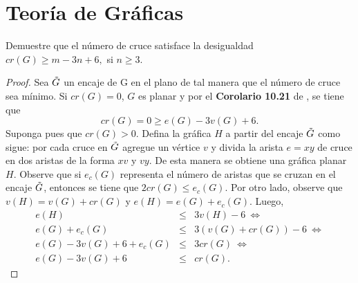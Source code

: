 \documentclass[12pt]{article}
\newenvironment{problem}[2][Problema]{\begin{trivlist}
\item[\hskip \labelsep {\bfseries #1}\hskip \labelsep {\bfseries #2.}]}{\end{trivlist}}
\begin{document}
\section*{Teoría de Gráficas}


\begin{problem}{10.3.1}
Demuestre que el número de cruce satisface la desigualdad $cr(G) \geq m - 3n + 6,$ si $n \geq 3.$
\end{problem}
\begin{proof}
Sea $\Tilde{G}$ un encaje de G en el plano de tal manera que el número de cruce sea mínimo. Si $cr(G)  = 0$, $G$ es planar y por el \textbf{Corolario 10.21} de \cite{10.5555/1481153}, se tiene que
$$cr(G) = 0 \geq e(G) - 3v(G) + 6.$$
Suponga pues que $cr(G) > 0.$ Defina la gráfica $H$ a partir del encaje $\Tilde{G}$ como sigue: por cada cruce en $\Tilde{G}$ agregue un vértice $v$ y divida la arista $e = xy$ de cruce en dos aristas de la forma $xv$ y $vy.$ De esta manera se obtiene una gráfica planar $H$. Observe que si $e_c(G)$ representa el número de aristas que se cruzan en el encaje $\Tilde{G}$, entonces se tiene que $2 cr(G) \leq e_c(G).$ Por otro lado, observe que $v(H) = v(G) + cr(G)$ y $e(H) = e(G) + e_c(G).$ Luego,
\begin{eqnarray*}
e(H) &\leq& 3 v(H) - 6 \ \iff \\
e(G) + e_c(G) &\leq& 3(v(G) + cr(G)) -6 \ \iff \\
e(G) - 3v(G) + 6 + e_c(G) &\leq& 3cr(G) \ \iff \\
e(G) - 3v(G) + 6 &\leq& cr(G).
\end{eqnarray*}

\end{proof}
\end{document}
